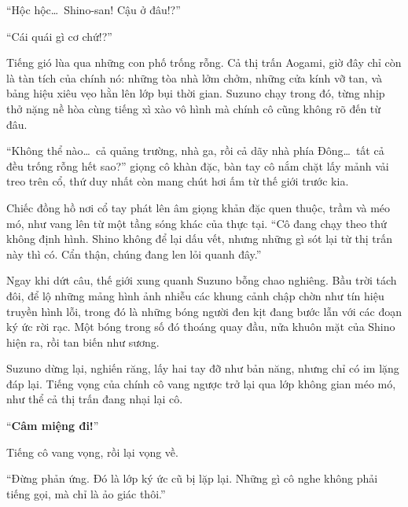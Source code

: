 \documentclass[../main.tex]{subfiles}
\begin{document}

``Hộc hộc\dots\ Shino-san! Cậu ở đâu!?''

``Cái quái gì cơ chứ!?''

Tiếng gió lùa qua những con phố trống rỗng. Cả thị trấn Aogami, giờ đây chỉ còn là tàn tích của chính nó: những tòa nhà lởm chởm, những cửa kính vỡ tan, và bảng hiệu xiêu vẹo hằn lên lớp bụi thời gian. Suzuno chạy trong đó, từng nhịp thở nặng nề hòa cùng tiếng xì xào vô hình mà chính cô cũng không rõ đến từ đâu.

``Không thể nào\dots\ cả quảng trường, nhà ga, rồi cả dãy nhà phía Đông\dots\ tất cả đều trống rỗng hết sao?'' giọng cô khàn đặc, bàn tay cô nắm chặt lấy mảnh vải treo trên cổ, thứ duy nhất còn mang chút hơi ấm từ thế giới trước kia.

Chiếc đồng hồ nơi cổ tay phát lên âm giọng khản đặc quen thuộc, trầm và méo mó, như vang lên từ một tầng sóng khác của thực tại. ``Cô đang chạy theo thứ không định hình. Shino không để lại dấu vết, nhưng những gì sót lại từ thị trấn này thì có. Cẩn thận, chúng đang len lỏi quanh đây.''

Ngay khi dứt câu, thế giới xung quanh Suzuno bỗng chao nghiêng. Bầu trời tách đôi, để lộ những mảng hình ảnh nhiễu các khung cảnh chập chờn như tín hiệu truyền hình lỗi, trong đó là những bóng người đen kịt đang bước lẫn với các đoạn ký ức rời rạc. Một bóng trong số đó thoáng quay đầu, nửa khuôn mặt của Shino hiện ra, rồi tan biến như sương.

Suzuno dừng lại, nghiến răng, lấy hai tay đỡ như bản năng, nhưng chỉ có im lặng đáp lại. Tiếng vọng của chính cô vang ngược trở lại qua lớp không gian méo mó, như thể cả thị trấn đang nhại lại cô.

``\textbf{Câm miệng đi!}''

Tiếng cô vang vọng, rồi lại vọng về.

``Đừng phản ứng. Đó là lớp ký ức cũ bị lặp lại. Những gì cô nghe không phải tiếng gọi, mà chỉ là ảo giác thôi.''
\end{document}
